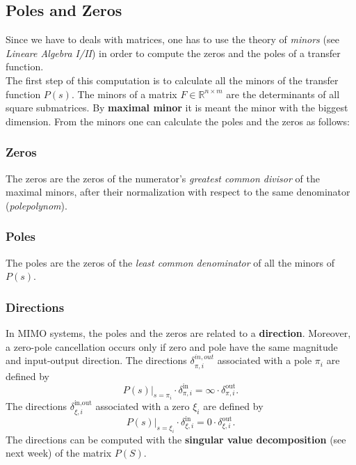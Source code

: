 \documentclass[a4paper,12 pt]{article}
\numberwithin{equation}{section}
\theoremstyle{definition}
\theoremstyle{remark}
\theoremstyle{definition}
\theoremstyle{definition}
\theoremstyle{definition}
\theoremstyle{remark}
\begin{document}
\subsection{Poles and Zeros}
Since we have to deals with matrices, one has to use the theory of \textit{minors} (see \textit{Lineare Algebra I/II}) in order to compute the zeros and the poles of a transfer function. \\
The first step of this computation is to calculate all the minors of the transfer function $P(s)$. The minors of a matrix $F\in \mathbb{R}^{n\times m}$ are the determinants of all square submatrices. By \textbf{maximal minor} it is meant the minor with the biggest dimension. From the minors one can calculate the poles and the zeros as follows:
\subsubsection{Zeros}
The zeros are the zeros of the numerator's \textit{greatest common divisor} of the maximal minors, after their normalization with respect to the same denominator (\textit{polepolynom}).
\subsubsection{Poles}
The poles are the zeros of the \textit{least common denominator} of all the minors of $P(s)$.
\subsubsection{Directions}
In MIMO systems, the poles and the zeros are related to a \textbf{direction}. Moreover, a zero-pole cancellation occurs only if zero and pole have the same magnitude and input-output direction. The directions $\delta_{\pi,i}^{in,out}$ associated with a pole $\pi_i$ are defined by
\begin{equation}
P(s)\big|_{s=\pi_i}\cdot\delta_{\pi,i}^\text{in}=\infty\cdot\delta_{\pi,i}^\text{out}.
\end{equation}
The directions $\delta_{\xi,i}^\text{in,out}$ associated with a zero $\xi_i$ are defined by
\begin{equation}
P(s)\big|_{s=\xi_i}\cdot\delta_{\xi,i}^\text{in}=0\cdot\delta_{\xi,i}^\text{out}.
\end{equation}
The directions can be computed with the \textbf{singular value decomposition} (see next week) of the matrix $P(S)$.
\end{document}
